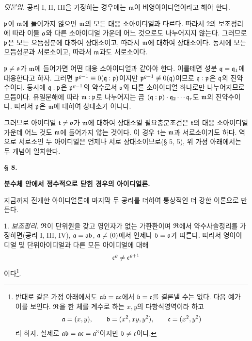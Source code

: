 \emph{덧붙임.} 공리 I, II, III을 가정하는 경우에는 \(\mathfrak{m}\)이 비영아이디얼이라고 해야 한다.

\(\mathfrak{p}\)이 \(\mathfrak{m}\)에 들어가지 않으면 \(\mathfrak{m}\)의 모든 대응 소아이디얼과 다르다. 따라서 2의 보조정리에 따라 이들 \(\mathfrak{o}\)와 다른 소아이디얼 가운데 어느 것으로도 나누어지지 않는다. 그러므로 \(\mathfrak{p}\)은 모든 으뜸성분에 대하여 상대소이고, 따라서 \(\mathfrak{m}\)에 대하여 상대소이다. 동시에 모든 으뜸성분과 서로소이고, 따라서 \(\mathfrak{m}\)과도 서로소이다.

\(\mathfrak{p}\ne\mathfrak{o}\)가 \(\mathfrak{m}\)에 들어가면 어떤 대응 소아이디얼과 같아야 한다. 이를테면 성분 \(\mathfrak{q}=\mathfrak{q}_1\)에 대응한다고 하자. 그러면 \(\mathfrak{p}^{\varrho-1}\equiv0(\mathfrak{q}:\mathfrak{p})\)이지만 \(\mathfrak{p}^{\varrho-1}\not\equiv0(\mathfrak{q})\)이므로 \(\mathfrak{q}:\mathfrak{p}\)은 \(\mathfrak{q}\)의 진약수이다. 동시에 \(\mathfrak{q}:\mathfrak{p}\)은 \(\mathfrak{p}^{\varrho-1}\)의 약수로서 \(\mathfrak{o}\)와 다른 소아이디얼 하나로만 나누어지므로 으뜸이다. 유일분해에 따라 \(\mathfrak{m}:\mathfrak{p}\)로 나누어지는 곱 \((\mathfrak{q}:\mathfrak{p})\cdot\mathfrak{q}_2\cdots\mathfrak{q}_r\)도 \(\mathfrak{m}\)의 진약수이다. 따라서 \(\mathfrak{p}\)은 \(\mathfrak{m}\)에 대하여 상대소가 아니다.

그러므로 아이디얼 \(\mathfrak{t}\ne\mathfrak{o}\)가 \(\mathfrak{m}\)에 대하여 상대소일 필요충분조건은 \(\mathfrak{t}\)의 대응 소아이디얼 가운데 어느 것도 \(\mathfrak{m}\)에 들어가지 않는 것이다. 이 경우 \(\mathfrak{t}\)는 \(\mathfrak{m}\)과 서로소이기도 하다. 역으로 서로소인 두 아이디얼은 언제나 서로 상대소이므로(§ 5, 5), 위 가정 아래에서는 두 개념이 일치한다.

\begin{center}
{\bfseries\large § 8.\par}
\vspace{0.35em}
{\bfseries\large 분수체 안에서 정수적으로 닫힌 경우의 아이디얼론.\par}
\end{center}

지금까지 전개한 아이디얼론에 마지막 두 공리를 더하여 통상적인 더 강한 이론으로 만든다.

1. \emph{보조정리.} \(\mathfrak{R}\)이 단위원을 갖고 영인자가 없는 가환환이며 \(\mathfrak{R}\)에서 약수사슬정리를 가정하면(공리 I, III, IV), \(\mathfrak{a}=\mathfrak{a}\mathfrak{b}\), \(\mathfrak{a}\ne(0)\)에서 언제나 \(\mathfrak{b}=\mathfrak{o}\)가 따른다. 따라서 영아이디얼 및 단위아이디얼과 다른 모든 아이디얼에 대해
\[
        \mathfrak{c}^\varrho\ne\mathfrak{c}^{\varrho+1}
\]
이다\footnote{반대로 같은 가정 아래에서도 \(\mathfrak{a}\mathfrak{b}=\mathfrak{a}\mathfrak{c}\)에서 \(\mathfrak{b}=\mathfrak{c}\)를 결론낼 수는 없다. 다음 예가 이를 보인다. \(\mathfrak{R}\)을 한 체를 계수로 하는 \(x,y\)의 다항식영역이라 하고
\[
\mathfrak{a}=(x,y),\qquad \mathfrak{b}=(x^2,xy,y^2),\qquad \mathfrak{c}=(x^2,y^2)
\]
라 하자. 실제로 \(\mathfrak{a}\mathfrak{b}=\mathfrak{a}\mathfrak{c}=\mathfrak{a}^3\)이지만 \(\mathfrak{b}\ne\mathfrak{c}\)이다.}.

